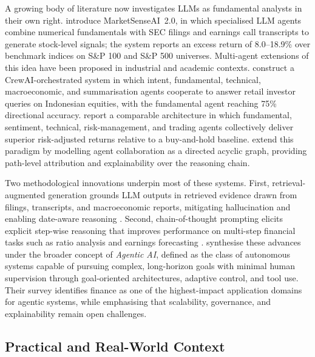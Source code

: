 A growing body of literature now investigates LLMs as fundamental analysts in their own right. \citet{Fatouros2025MarketSense} introduce MarketSenseAI~2.0, in which specialised LLM agents combine numerical fundamentals with SEC filings and earnings call transcripts to generate stock-level signals; the system reports an excess return of 8.0--18.9\% over benchmark indices on S\&P 100 and S\&P 500 universes. Multi-agent extensions of this idea have been proposed in industrial and academic contexts. \citet{Bangun2025} construct a CrewAI-orchestrated system in which intent, fundamental, technical, macroeconomic, and summarisation agents cooperate to answer retail investor queries on Indonesian equities, with the fundamental agent reaching 75\% directional accuracy. \citet{Cheng2025} report a comparable architecture in which fundamental, sentiment, technical, risk-management, and trading agents collectively deliver superior risk-adjusted returns relative to a buy-and-hold baseline. \citet{rezaei2025gwise} extend this paradigm by modelling agent collaboration as a directed acyclic graph, providing path-level attribution and explainability over the reasoning chain.

Two methodological innovations underpin most of these systems. First, retrieval-augmented generation grounds LLM outputs in retrieved evidence drawn from filings, transcripts, and macroeconomic reports, mitigating hallucination and enabling date-aware reasoning \citep{Fatouros2025MarketSense,rezaei2025gwise}. Second, chain-of-thought prompting elicits explicit step-wise reasoning that improves performance on multi-step financial tasks such as ratio analysis and earnings forecasting \citep{Papasotiriou2024}. \citet{Acharya2025AgenticAI} synthesise these advances under the broader concept of \emph{Agentic AI}, defined as the class of autonomous systems capable of pursuing complex, long-horizon goals with minimal human supervision through goal-oriented architectures, adaptive control, and tool use. Their survey identifies finance as one of the highest-impact application domains for agentic systems, while emphasising that scalability, governance, and explainability remain open challenges.



\subsection{Practical and Real-World Context}
\label{sec:practical}

